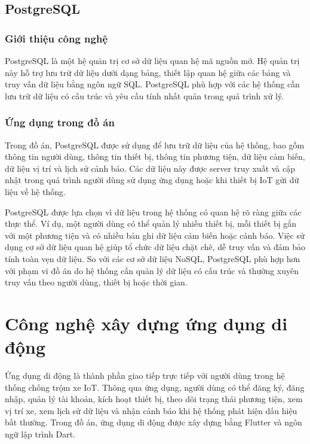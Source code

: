\documentclass[../DoAn.tex]{subfiles}
\begin{document}
\subsection{PostgreSQL}
\label{subsection:3.postgresql}

\subsubsection{Giới thiệu công nghệ}

PostgreSQL là một hệ quản trị cơ sở dữ liệu quan hệ mã nguồn mở. Hệ quản trị này hỗ trợ lưu trữ dữ liệu dưới dạng bảng, thiết lập quan hệ giữa các bảng và truy vấn dữ liệu bằng ngôn ngữ SQL. PostgreSQL phù hợp với các hệ thống cần lưu trữ dữ liệu có cấu trúc và yêu cầu tính nhất quán trong quá trình xử lý.

\subsubsection{Ứng dụng trong đồ án}

Trong đồ án, PostgreSQL được sử dụng để lưu trữ dữ liệu của hệ thống, bao gồm thông tin người dùng, thông tin thiết bị, thông tin phương tiện, dữ liệu cảm biến, dữ liệu vị trí và lịch sử cảnh báo. Các dữ liệu này được server truy xuất và cập nhật trong quá trình người dùng sử dụng ứng dụng hoặc khi thiết bị IoT gửi dữ liệu về hệ thống.

PostgreSQL được lựa chọn vì dữ liệu trong hệ thống có quan hệ rõ ràng giữa các thực thể. Ví dụ, một người dùng có thể quản lý nhiều thiết bị, mỗi thiết bị gắn với một phương tiện và có nhiều bản ghi dữ liệu cảm biến hoặc cảnh báo. Việc sử dụng cơ sở dữ liệu quan hệ giúp tổ chức dữ liệu chặt chẽ, dễ truy vấn và đảm bảo tính toàn vẹn dữ liệu. So với các cơ sở dữ liệu NoSQL, PostgreSQL phù hợp hơn với phạm vi đồ án do hệ thống cần quản lý dữ liệu có cấu trúc và thường xuyên truy vấn theo người dùng, thiết bị hoặc thời gian.

\section{Công nghệ xây dựng ứng dụng di động}
\label{section:3.mobile}

Ứng dụng di động là thành phần giao tiếp trực tiếp với người dùng trong hệ thống chống trộm xe IoT. Thông qua ứng dụng, người dùng có thể đăng ký, đăng nhập, quản lý tài khoản, kích hoạt thiết bị, theo dõi trạng thái phương tiện, xem vị trí xe, xem lịch sử dữ liệu và nhận cảnh báo khi hệ thống phát hiện dấu hiệu bất thường. Trong đồ án, ứng dụng di động được xây dựng bằng Flutter và ngôn ngữ lập trình Dart.
\end{document}
